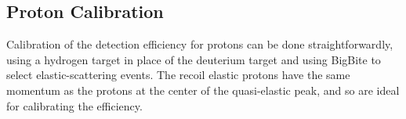 \documentclass[12pt,letterpaper,oneside]{article}
\begin{document}

\subsection{Proton Calibration}

Calibration of the detection efficiency for protons can be done
straightforwardly, using a hydrogen target in place of the deuterium
target and using BigBite to select elastic-scattering events.  The
recoil elastic protons have the same momentum as the protons at the
center of the quasi-elastic peak, and so are ideal for calibrating the
efficiency.  



\end{document}
